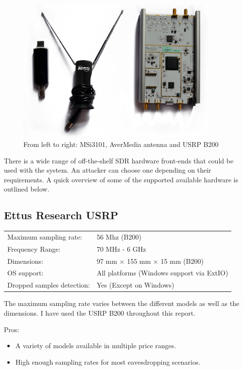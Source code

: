 \documentclass[a4paper,12pt,twoside,openright]{report}
\begin{document}
\begin{figure}[h!]
 
  \centering
    \includegraphics[width=0.9\textwidth]{equipment}
    \caption{From left to right: MSi3101, AverMedia antenna and USRP B200}
\end{figure}

There is a wide range of off-the-shelf SDR hardware front-ends that could be used with the system. An attacker can choose one depending on their requirements. A quick overview of some of the supported available hardware is outlined below.

\subsection{Ettus Research USRP}

\begin{tabular}{ll}
	Maximum sampling rate: & 56 Mhz (B200) \\
	Frequency Range: & 70 MHz - 6 GHz \\
	Dimensions: & 97 mm $\times$ 155 mm $\times$ 15 mm (B200) \\
	OS support: & All platforms (Windows support via ExtIO) \\
	Dropped samples detection: & Yes (Except on Windows)
\end{tabular}

The maximum sampling rate varies between the different models as well as the dimensions. I have used the USRP B200 throughout this report.

Pros:
\begin{itemize}
	\item A variety of models available in multiple price ranges.
	\item High enough sampling rates for most eavesdropping scenarios.
\end{itemize}
\end{document}
